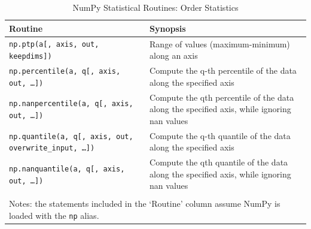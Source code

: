 \documentclass[a4paper,11pt]{book}
\begin{document}
\begin{table}
	\centering
	\caption{NumPy Statistical Routines: Order Statistics}
	\label{tab:order_stats}
	\begin{tabular}{ll}
		\toprule \toprule
			Routine & Synopsis \\
			\midrule
                        \texttt{np.ptp(a[, axis, out, keepdims])}&
                        Range of values (maximum-minimum) along an axis\\
                        \texttt{np.percentile(a, q[, axis, out, \ldots])}&
                        Compute the q-th percentile of the data along the specified axis\\
                        \texttt{np.nanpercentile(a, q[, axis, out, \ldots])}&
                        Compute the qth percentile of the data along the specified axis, while ignoring nan values\\
                        \texttt{np.quantile(a, q[, axis, out, overwrite\_input, \ldots])}&
                        Compute the q-th quantile of the data along the specified axis\\
                        \texttt{np.nanquantile(a, q[, axis, out, \ldots])}&
                        Compute the qth quantile of the data along the specified axis, while ignoring nan values\\
	     	\bottomrule \\[-1.8ex]
	        \multicolumn{2}{l}{Notes: the statements included in the `Routine' column assume NumPy is loaded with the \texttt{np} alias.} \\
	\end{tabular}
\end{table}
\end{document}
